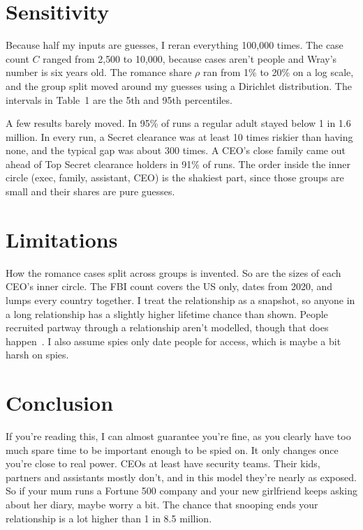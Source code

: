 \documentclass[11pt]{article}
\theoremstyle{definition}
\begin{document}
\section{Sensitivity}\label{sec:sens}

Because half my inputs are guesses, I reran everything 100{,}000 times. The case count $C$ ranged from 2{,}500 to 10{,}000, because cases aren't people and Wray's number is six years old. The romance share $\rho$ ran from 1\% to 20\% on a log scale, and the group split moved around my guesses using a Dirichlet distribution. The intervals in Table~1 are the 5th and 95th percentiles.

A few results barely moved. In 95\% of runs a regular adult stayed below 1 in 1.6 million. In every run, a Secret clearance was at least 10 times riskier than having none, and the typical gap was about 300 times. A CEO's close family came out ahead of Top Secret clearance holders in 91\% of runs. The order inside the inner circle (exec, family, assistant, CEO) is the shakiest part, since those groups are small and their shares are pure guesses.

\section{Limitations}

How the romance cases split across groups is invented. So are the sizes of each CEO's inner circle. The FBI count covers the US only, dates from 2020, and lumps every country together. I treat the relationship as a snapshot, so anyone in a long relationship has a slightly higher lifetime chance than shown. People recruited partway through a relationship aren't modelled, though that does happen~\cite{csis}. I also assume spies only date people for access, which is maybe a bit harsh on spies.

\section{Conclusion}

If you're reading this, I can almost guarantee you're fine, as you clearly have too much spare time to be important enough to be spied on. It only changes once you're close to real power. CEOs at least have security teams. Their kids, partners and assistants mostly don't, and in this model they're nearly as exposed. So if your mum runs a Fortune 500 company and your new girlfriend keeps asking about her diary, maybe worry a bit. The chance that snooping ends your relationship is a lot higher than 1 in 8.5 million.
\end{document}
